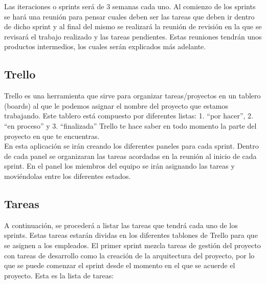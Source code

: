 
Las iteraciones o sprints será de 3 semanas cada uno. Al comienzo de los sprints se hará una reunión para pensar cuales deben ser las tareas que deben ir dentro de dicho sprint y al final del mismo se realizará la reunión de revisión en la que se revisará el trabajo realizado y las tareas pendientes. Estas reuniones tendrán unos productos intermedios, los cuales serán explicados más adelante.\\



\subsection{Trello}

Trello es una herramienta que sirve para organizar tareas/proyectos en un tablero (boards) al que le podemos asignar el nombre del proyecto que estamos trabajando. Este tablero está compuesto por diferentes listas: 1. “por hacer”, 2. “en proceso” y 3. “finalizada” Trello te hace saber en todo momento la parte del proyecto en que te encuentras.\\


En esta aplicación se irán creando los diferentes paneles para cada sprint. Dentro de cada panel se organizaran las tareas acordadas en la reunión al inicio de cada sprint. En el panel los miembros del equipo se irán asignando las tareas y moviéndolas entre los diferentes estados.


\subsection{Tareas}
A continuación, se procederá a listar las tareas que tendrá cada uno de los sprints. Estas tareas estarán dividas en los diferentes tablones de Trello para que se asignen a los empleados. El primer sprint mezcla tareas de gestión del proyecto con tareas de desarrollo como la creación de la arquitectura del proyecto, por lo que se puede comenzar el sprint desde el momento en el que se acuerde el proyecto. Esta es la lista de tareas:

